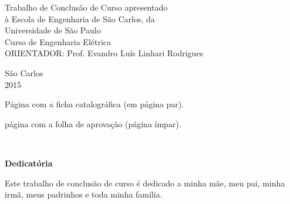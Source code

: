 		\large
		{
			\begin{flushright}
			\Large{Trabalho de Conclusão de Curso apresentado} \hspace{1cm}\\
			\Large{à Escola de Engenharia de São Carlos, da}\\
			\Large{Universidade de São Paulo}\\
			\vspace{0.05\textheight}
			\Large{Curso de Engenharia Elétrica}\\
			\vspace{0.05\textheight}
			\Large{ORIENTADOR: Prof. Evandro Luís Linhari Rodrigues}\\
			\end{flushright}
	
			\begin{center}
				\vspace{0.15\textheight}
				\Large{São Carlos}\\
				\Large{2015}
			\end{center}
		}



\newpage

Página com a ficha catalográfica (em página par).

%

\newpage

página com a folha de aprovação (página ímpar). \cleardoublepage

\begin{comment}
\begin{figure}[H]
	\centering
	\texttt{[image: ./Resources/aprovacao.jpg]}
	\caption{Fluxo de comunicação entre os principais componentes.}
	\label{Aprovacao}
\end{figure}
\cleardoublepage
\end{comment}
\
\vspace{0.11\textheight} 
\begin{center}
\textbf{\Huge{Dedicatória}}
\end{center}
\vspace{0.05\textheight}	
		
Este trabalho de conclusão de curso é dedicado a minha mãe, meu pai, minha irmã, meus padrinhos e toda minha família.
		
